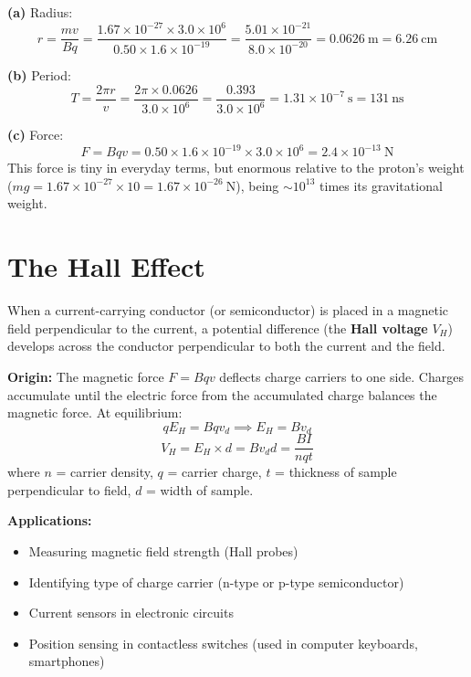 \begin{solutionbox}
\textbf{(a)} Radius:
\[
  r = \frac{mv}{Bq}
  = \frac{1.67\times10^{-27}
    \times 3.0\times10^6}
    {0.50 \times 1.6\times10^{-19}}
  = \frac{5.01\times10^{-21}}
    {8.0\times10^{-20}}
  = 0.0626\ \text{m} = 6.26\ \text{cm}
\]

\textbf{(b)} Period:
\[
  T = \frac{2\pi r}{v}
  = \frac{2\pi \times 0.0626}{3.0\times10^6}
  = \frac{0.393}{3.0\times10^6}
  = 1.31\times10^{-7}\ \text{s} = 131\ \text{ns}
\]

\textbf{(c)} Force:
\[
  F = Bqv = 0.50 \times 1.6\times10^{-19}
  \times 3.0\times10^6
  = 2.4\times10^{-13}\ \text{N}
\]
This force is tiny in everyday terms, but enormous
relative to the proton's weight
($mg = 1.67\times10^{-27} \times 10
= 1.67\times10^{-26}\ \text{N}$), being
$\sim10^{13}$ times its gravitational weight.
\end{solutionbox}

\section{The Hall Effect}

\begin{processbox}
When a current-carrying conductor (or semiconductor)
is placed in a magnetic field perpendicular to the
current, a potential difference (the \textbf{Hall
voltage} $V_H$) develops across the conductor
perpendicular to both the current and the field.

\textbf{Origin:} The magnetic force $F = Bqv$ deflects
charge carriers to one side. Charges accumulate until
the electric force from the accumulated charge balances
the magnetic force. At equilibrium:
\[
  qE_H = Bqv_d
  \implies E_H = Bv_d
\]
\[
  V_H = E_H \times d = Bv_d d
  = \frac{BI}{nqt}
\]
where $n$ = carrier density, $q$ = carrier charge,
$t$ = thickness of sample perpendicular to field,
$d$ = width of sample.

\textbf{Applications:}
\begin{itemize}[noitemsep]
  \item Measuring magnetic field strength (Hall
  probes)
  \item Identifying type of charge carrier
  (n-type or p-type semiconductor)
  \item Current sensors in electronic circuits
  \item Position sensing in contactless switches
  (used in computer keyboards, smartphones)
\end{itemize}
\end{processbox}

